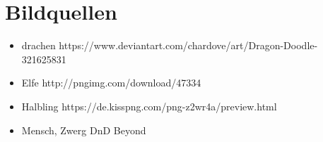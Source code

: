 \chapter{Bildquellen}

\begin{itemize}
  \item drachen
  \subitem https://www.deviantart.com/chardove/art/Dragon-Doodle-321625831

  \item Elfe
  \subitem http://pngimg.com/download/47334

  \item Halbling
  \subitem https://de.kisspng.com/png-z2wr4a/preview.html

  \item Mensch, Zwerg
  \subitem DnD Beyond

\end{itemize}
